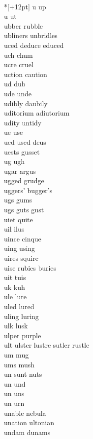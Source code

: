 \vspace{14pt}
\noindent\notextbf{\LargeU}\\*[+12pt]
u up \\
u ut \\
ubber rubble \\
ubliners unbridles \\
uced deduce educed  \\
uch chum \\
ucre cruel \\
uction caution \\
ud dub \\
ude unde \\
udibly daubily \\
uditorium adiutorium \\
udity untidy \\
ue use \\
ued used deus \\
uests gusset \\
ug ugh \\
ugar argus \\
ugged grudge \\
uggers' bugger's \\
ugs gums \\
ugs guts gust \\
uiet quite \\
uil ilus \\
uince cinque \\
uing using \\
uires squire \\
uise rubies buries  \\
uit tuis \\
uk kuh \\
ule lure \\
uled lured \\
uling luring \\
ulk lusk \\
ulper purple \\
ult ulster lustre sutler rustle   \\
um mug \\
ums mush \\
un sunt nuts  \\
un und \\
un uns \\
un urn \\
unable nebula\\
unation ultonian \\
undam dunams \\
